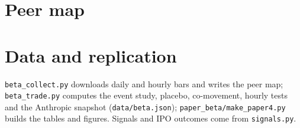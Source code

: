 \documentclass[11pt]{article}
\begin{document}



\appendix
\section{Peer map}\label{app:map}


\section{Data and replication}
\texttt{beta\_collect.py} downloads daily and hourly bars and writes the peer map; \texttt{beta\_trade.py} computes the event study, placebo, co-movement, hourly tests and the Anthropic snapshot (\texttt{data/beta.json}); \texttt{paper\_beta/make\_paper4.py} builds the tables and figures. Signals and IPO outcomes come from \texttt{signals.py}.
\end{document}
